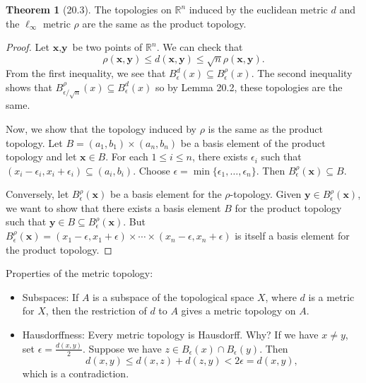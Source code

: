 \documentclass{article}
\newcommand{\nline}{\vspace*{0.5\baselineskip}}
\theoremstyle{definition}
\newtheorem{theorem}{Theorem}[subsection]
\begin{document}
\begin{flushleft}
\begin{theorem}[20.3]
The topologies on $\mathbb{R}^n$ induced by the euclidean metric $d$ and the $\ell_\infty$ metric $\rho$ are the same as the product topology.
\end{theorem}

\begin{proof}
Let $\textbf{x},\textbf{y}$ be two points of $\mathbb{R}^n$. We can check that
\[
\rho(\textbf{x},\textbf{y}) \leq d(\textbf{x},\textbf{y}) \leq \sqrt{n} \rho(\textbf{x},\textbf{y}).
\]
From the first inequality, we see that $B_\epsilon^d(x) \subseteq B_\epsilon^\rho(x)$. The second inequality shows that $B_{\epsilon/\sqrt{n}}^\rho(x) \subseteq B_\epsilon^d(x)$ so by Lemma 20.2, these topologies are the same.

\nline

Now, we show that the topology induced by $\rho$ is the same as the product topology. Let $B = (a_1,b_1) \times (a_n,b_n)$ be a basis element of the product topology and let $\textbf{x} \in B$. For each $1 \leq i \leq n$, there exists $\epsilon_i$ such that $(x_i - \epsilon_i, x_i + \epsilon_i) \subseteq (a_i, b_i)$. Choose $\epsilon = \min\{\epsilon_1,\dots,\epsilon_n\}$. Then $B_\epsilon^\rho(\textbf{x}) \subseteq B$.

\nline

Conversely, let $B_\epsilon^\rho(\textbf{x})$ be a basis element for the $\rho$-topology. Given $\textbf{y} \in B_\epsilon^\rho(\textbf{x})$, we want to show that there exists a basis element $B$ for the product topology such that $\textbf{y} \in B \subseteq B_\epsilon^\rho(\textbf{x})$. But $B_\epsilon^\rho(\textbf{x}) = (x_1 - \epsilon, x_1 + \epsilon) \times \cdots \times (x_n - \epsilon, x_n + \epsilon)$ is itself a basis element for the product topology.
\end{proof}

Properties of the metric topology:

\begin{itemize}
    \item Subspaces: If $A$ is a subspace of the topological space $X$, where $d$ is a metric for $X$, then the restriction of $d$ to $A$ gives a metric topology on $A$.
    \item Hausdorffness: Every metric topology is Hausdorff. Why? If we have $x \neq y$, set $\epsilon = \frac{d(x,y)}{2}$. Suppose we have $z \in B_\epsilon(x) \cap B_\epsilon(y)$. Then
    \[
    d(x,y) \leq d(x,z) + d(z,y) < 2\epsilon = d(x,y),
    \]
    which is a contradiction.
\end{itemize}


\end{flushleft}
\end{document}
